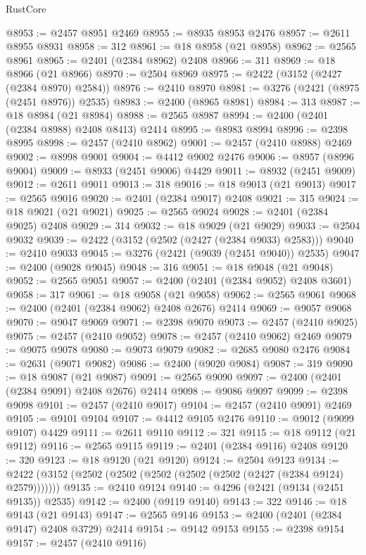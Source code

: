 \begin{lexlean}{RustCore}
\begin{coremodule}
@8953 := @2457 @8951 @2469
@8955 := @8935 @8953 @2476
@8957 := @2611 @8955 @8931
@8958 := 312
@8961 := @18 @8958 (@21 @8958)
@8962 := @2565 @8961
@8965 := @2401 (@2384 @8962) @2408
@8966 := 311
@8969 := @18 @8966 (@21 @8966)
@8970 := @2504 @8969
@8975 := @2422 (@3152 (@2427 (@2384 @8970) @2584))
@8976 := @2410 @8970
@8981 := @3276 (@2421 (@8975 (@2451 @8976)) @2535)
@8983 := @2400 (@8965 @8981)
@8984 := 313
@8987 := @18 @8984 (@21 @8984)
@8988 := @2565 @8987
@8994 := @2400 (@2401 (@2384 @8988) @2408 @8413) @2414
@8995 := @8983 @8994
@8996 := @2398 @8995
@8998 := @2457 (@2410 @8962)
@9001 := @2457 (@2410 @8988) @2469
@9002 := @8998 @9001
@9004 := @4412 @9002 @2476
@9006 := @8957 (@8996 @9004)
@9009 := @8933 (@2451 @9006) @4429
@9011 := @8932 (@2451 @9009)
@9012 := @2611 @9011
@9013 := 318
@9016 := @18 @9013 (@21 @9013)
@9017 := @2565 @9016
@9020 := @2401 (@2384 @9017) @2408
@9021 := 315
@9024 := @18 @9021 (@21 @9021)
@9025 := @2565 @9024
@9028 := @2401 (@2384 @9025) @2408
@9029 := 314
@9032 := @18 @9029 (@21 @9029)
@9033 := @2504 @9032
@9039 := @2422 (@3152 (@2502 (@2427 (@2384 @9033) @2583)))
@9040 := @2410 @9033
@9045 := @3276 (@2421 (@9039 (@2451 @9040)) @2535)
@9047 := @2400 (@9028 @9045)
@9048 := 316
@9051 := @18 @9048 (@21 @9048)
@9052 := @2565 @9051
@9057 := @2400 (@2401 (@2384 @9052) @2408 @3601)
@9058 := 317
@9061 := @18 @9058 (@21 @9058)
@9062 := @2565 @9061
@9068 := @2400 (@2401 (@2384 @9062) @2408 @2676) @2414
@9069 := @9057 @9068
@9070 := @9047 @9069
@9071 := @2398 @9070
@9073 := @2457 (@2410 @9025)
@9075 := @2457 (@2410 @9052)
@9078 := @2457 (@2410 @9062) @2469
@9079 := @9075 @9078
@9080 := @9073 @9079
@9082 := @2685 @9080 @2476
@9084 := @2631 (@9071 @9082)
@9086 := @2400 (@9020 @9084)
@9087 := 319
@9090 := @18 @9087 (@21 @9087)
@9091 := @2565 @9090
@9097 := @2400 (@2401 (@2384 @9091) @2408 @2676) @2414
@9098 := @9086 @9097
@9099 := @2398 @9098
@9101 := @2457 (@2410 @9017)
@9104 := @2457 (@2410 @9091) @2469
@9105 := @9101 @9104
@9107 := @4412 @9105 @2476
@9110 := @9012 (@9099 @9107) @4429
@9111 := @2611 @9110
@9112 := 321
@9115 := @18 @9112 (@21 @9112)
@9116 := @2565 @9115
@9119 := @2401 (@2384 @9116) @2408
@9120 := 320
@9123 := @18 @9120 (@21 @9120)
@9124 := @2504 @9123
@9134 := @2422 (@3152 (@2502 (@2502 (@2502 (@2502 (@2502 (@2427 (@2384 @9124) @2579)))))))
@9135 := @2410 @9124
@9140 := @4296 (@2421 (@9134 (@2451 @9135)) @2535)
@9142 := @2400 (@9119 @9140)
@9143 := 322
@9146 := @18 @9143 (@21 @9143)
@9147 := @2565 @9146
@9153 := @2400 (@2401 (@2384 @9147) @2408 @3729) @2414
@9154 := @9142 @9153
@9155 := @2398 @9154
@9157 := @2457 (@2410 @9116)

\end{coremodule}
\end{lexlean}

